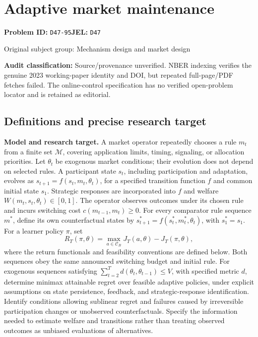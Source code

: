 \documentclass[11pt,a4paper]{article}
\begin{document}
\section*{Adaptive market maintenance}
\textbf{Problem ID:} \texttt{D47-95}\quad \textbf{JEL:} \texttt{D47}\par
\label{problem:OP-0299}
{\sffamily\small\color{muted}Original subject group: Mechanism design and market design\par}
\label{definitions:problem:30007581}
\textbf{Audit classification:} Source/provenance unverified. NBER indexing verifies the genuine 2023 working-paper identity and DOI, but repeated full-page/PDF fetches failed. The online-control specification has no verified open-problem locator and is retained as editorial.
\subsection*{Definitions and precise research target}
\textbf{Model and research target.} A market operator repeatedly chooses a rule \(m_t\) from a finite set \(\mathcal M\), covering application limits, timing, signaling, or allocation priorities. Let \(\theta_t\) be exogenous market conditions; their evolution does not depend on selected rules. A participant state \(s_t\), including participation and adaptation, evolves as \(s_{t+1}=f(s_t,m_t,\theta_t)\), for a specified transition function \(f\) and common initial state \(s_1\). Strategic responses are incorporated into \(f\) and welfare \(W(m_t,s_t,\theta_t)\in[0,1]\). The operator observes outcomes under its chosen rule and incurs switching cost \(c(m_{t-1},m_t)\geq0\). For every comparator rule sequence \(m^*\), define its own counterfactual states by \(s^*_{t+1}=f(s^*_t,m^*_t,\theta_t)\), with \(s^*_1=s_1\). For a learner policy \(\pi\), set
\[
 R_T(\pi,\theta)=\max_{a\in\mathcal C_B}J_T(a,\theta)-J_T(\pi,\theta),
\]
where the return functionals and feasibility conventions are defined below.
Both sequences obey the same announced switching budget and initial rule. For exogenous sequences satisfying \(\sum_{t=2}^T d(\theta_t,\theta_{t-1})\leq V\), with specified metric \(d\), determine minimax attainable regret over feasible adaptive policies, under explicit assumptions on state persistence, feedback, and strategic-response identification. Identify conditions allowing sublinear regret and failures caused by irreversible participation changes or unobserved counterfactuals. Specify the information needed to estimate welfare and transitions rather than treating observed outcomes as unbiased evaluations of alternatives.
\end{document}
